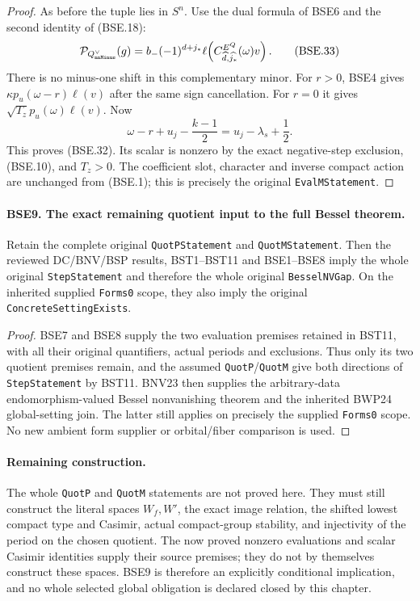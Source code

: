 \documentclass[11pt,a4paper]{article}
\numberwithin{equation}{section}
\theoremstyle{remark}\newtheorem{remark}[theorem]{Remark}
\begin{document}
\begin{proof}
As before the tuple lies in $S^n$.
Use the dual formula of BSE6 and the second identity of (BSE.18):
\[
 \mathcal P_{Q^\vee_{\texttt{nn\allowbreak Minus}}}(g)
       =b_-(-1)^{d+j_*}
               \ell\!\left(C^{E^Q}_{\widehat d,\widehat{j_*}}
                                                   (\omega)v\right).
 \tag{BSE.33}
\]
There is no minus-one shift in this complementary minor.
For $r>0$, BSE4 gives
$\kappa p_u(\omega-r)\ell(v)$ after the same sign cancellation.
For $r=0$ it gives
$\sqrt{T_z}p_u(\omega)\ell(v)$.
Now
\[
 \omega-r+u_j-\frac{k-1}{2}
                                  =u_j-\lambda_s+\frac12.
 \tag{BSE.34}
\]
This proves (BSE.32).  Its scalar is nonzero by the exact
negative-step exclusion, (BSE.10), and $T_z>0$.
The coefficient slot, character and inverse compact action are
unchanged from (BSE.1); this is precisely the original
\texttt{Eval\allowbreak MStatement}.
\end{proof}

\paragraph{BSE9. The exact remaining quotient input to the full Bessel theorem.}
\label{claim:BSE9}
Retain the complete original \texttt{Quot\allowbreak PStatement} and
\texttt{Quot\allowbreak MStatement}.  Then the reviewed DC/BNV/BSP results,
BST1--BST11 and BSE1--BSE8 imply the whole original
\texttt{Step\allowbreak Statement} and therefore the whole original
\texttt{Bessel\allowbreak NVGap}.
On the inherited supplied \texttt{Forms0} scope, they also imply
the original \texttt{Concrete\allowbreak Setting\allowbreak Exists}.

\begin{proof}
BSE7 and BSE8 supply the two evaluation premises retained in BST11,
with all their original quantifiers, actual periods and exclusions.
Thus only its two quotient premises remain, and the assumed
\texttt{Quot\allowbreak P}/\texttt{Quot\allowbreak M} give both directions of
\texttt{Step\allowbreak Statement} by BST11.
BNV23 then supplies the arbitrary-data endomorphism-valued Bessel
nonvanishing theorem and the inherited BWP24 global-setting join.
The latter still applies on precisely the supplied
\texttt{Forms0} scope.
No new ambient form supplier or orbital/fiber comparison is used.
\end{proof}

\paragraph{Remaining construction.}
The whole \texttt{Quot\allowbreak P} and \texttt{Quot\allowbreak M} statements are not
proved here.  They must still construct the literal spaces
$W_f,W'$, the exact image relation, the shifted lowest compact type
and Casimir, actual compact-group stability, and injectivity of
the period on the chosen quotient.
The now proved nonzero evaluations and scalar Casimir identities
supply their source premises; they do not by themselves construct
these spaces.  BSE9 is therefore an explicitly conditional
implication, and no whole selected global obligation is declared
closed by this chapter.
\end{document}
